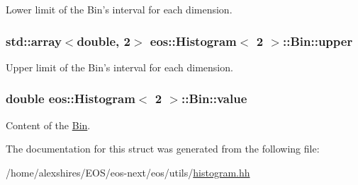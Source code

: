 Lower limit of the Bin's interval for each dimension. \hypertarget{structeos_1_1Histogram_3_012_01_4_1_1Bin_a3202307a2d3e2768e7c7a5eaebca2a60}{
\subsubsection[{upper}]{\setlength{\rightskip}{0pt plus 5cm}std::array$<$double, 2$>$ eos::Histogram$<$ 2 $>$::Bin::upper}}
\label{structeos_1_1Histogram_3_012_01_4_1_1Bin_a3202307a2d3e2768e7c7a5eaebca2a60}


Upper limit of the Bin's interval for each dimension. \hypertarget{structeos_1_1Histogram_3_012_01_4_1_1Bin_a060dd2645bb259a8ea810052c6efaa63}{
\subsubsection[{value}]{\setlength{\rightskip}{0pt plus 5cm}double eos::Histogram$<$ 2 $>$::Bin::value}}
\label{structeos_1_1Histogram_3_012_01_4_1_1Bin_a060dd2645bb259a8ea810052c6efaa63}


Content of the \hyperlink{structeos_1_1Histogram_3_012_01_4_1_1Bin}{Bin}. 

The documentation for this struct was generated from the following file:\begin{DoxyCompactItemize}
\item 
/home/alexshires/EOS/eos-\/next/eos/utils/\hyperlink{histogram_8hh}{histogram.hh}\end{DoxyCompactItemize}
